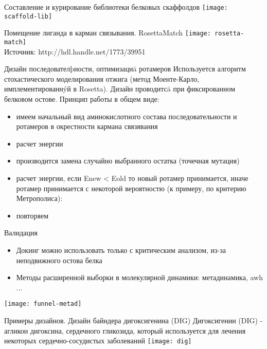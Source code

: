 \begin{frame}{Составление и курирование библиотеки белковых
скаффолдов}
\texttt{[image: scaffold-lib]}
\end{frame}

\begin{frame}{Помещение лиганда в карман связывания. RosettaMatch}
    \texttt{[image: rosetta-match]}\\
    Источник: http://hdl.handle.net/1773/39951
\end{frame}

\begin{frame}{Дизайн последователþности, оптимизациā ротамеров}
    Используется алгоритм стохастического моделирования отжига
    (метод Моенте-Карло, имплементированнýй в Rosetta). Дизайн
    проводитсā при фиксированном белковом остове.
    Принцип работы в общем виде:
    \begin{itemize}
        \item  имеем начальный вид аминокислотного состава последовательности и ротамеров в окрестности кармана связявания
        \item  расчет энергии
        \item производится замена случайно выбранного остатка (точечная мутация)
        \item  расчет энергии,   если Enew < Eold то новый ротамер принимается, иначе ротамер принимается с некоторой вероятностю (к
    примеру, по критерию Метрополиса):
        \item  повторяем
    \end{itemize}
\end{frame}

\begin{frame}{Валидация}
\begin{itemize}
    \item Докинг можно использовать только с критическим анализом, из-за неподвижного остова белка
    \item Методы расширенной выборки в молекулярной динамики: метадинамика, awh ...
\end{itemize}
\texttt{[image: funnel-metad]}
\end{frame}
    

\begin{frame}{Примеры дизайнов. Дизайн байндера дигоксигенина (DIG)}
    Дигоксигенин (DIG) - агликон дигоксина, сердечного
    гликозида, который используется для лечения
    некоторых сердечно-сосудистых заболеваний
    \texttt{[image: dig]}
\end{frame}

